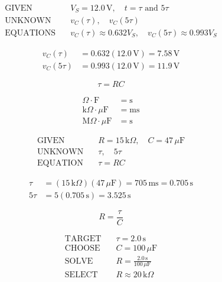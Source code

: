 \documentclass{article}
\begin{document}
\begin{preview}\[\begin{aligned}\text{GIVEN}&\quad V_S=12.0\,\mathrm{V},\quad t=\tau\text{ and }5\tau\\\text{UNKNOWN}&\quad v_C(\tau),\quad v_C(5\tau)\\\text{EQUATIONS}&\quad v_C(\tau)\approx0.632V_S,\quad v_C(5\tau)\approx0.993V_S\end{aligned}\]\end{preview}
\begin{preview}\[\begin{aligned}v_C(\tau)&=0.632(12.0\,\mathrm{V})=7.58\,\mathrm{V}\\v_C(5\tau)&=0.993(12.0\,\mathrm{V})=11.9\,\mathrm{V}\end{aligned}\]\end{preview}
\begin{preview}\[\tau=RC\]\end{preview}
\begin{preview}\[\begin{aligned}\Omega\cdot\mathrm{F}&=\mathrm{s}\\\mathrm{k}\Omega\cdot\mu\mathrm{F}&=\mathrm{ms}\\\mathrm{M}\Omega\cdot\mu\mathrm{F}&=\mathrm{s}\end{aligned}\]\end{preview}
\begin{preview}\[\begin{aligned}\text{GIVEN}&\quad R=15\,\mathrm{k}\Omega,\quad C=47\,\mu\mathrm{F}\\\text{UNKNOWN}&\quad \tau,\quad 5\tau\\\text{EQUATION}&\quad \tau=RC\end{aligned}\]\end{preview}
\begin{preview}\[\begin{aligned}\tau&=(15\,\mathrm{k}\Omega)(47\,\mu\mathrm{F})=705\,\mathrm{ms}=0.705\,\mathrm{s}\\5\tau&=5(0.705\,\mathrm{s})=3.525\,\mathrm{s}\end{aligned}\]\end{preview}
\begin{preview}\[R=\frac{\tau}{C}\]\end{preview}
\begin{preview}\[\begin{aligned}\text{TARGET}&\quad \tau=2.0\,\mathrm{s}\\\text{CHOOSE}&\quad C=100\,\mu\mathrm{F}\\\text{SOLVE}&\quad R=\frac{2.0\,\mathrm{s}}{100\,\mu\mathrm{F}}\\\text{SELECT}&\quad R\approx20\,\mathrm{k}\Omega\end{aligned}\]\end{preview}
\end{document}
